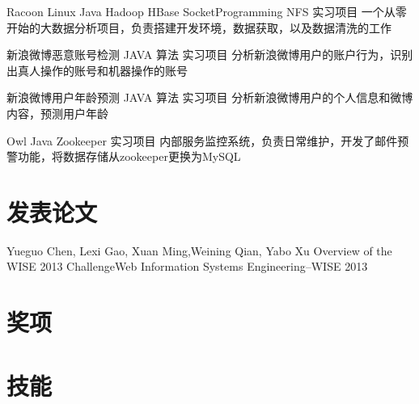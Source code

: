 \documentclass[11pt,a4paper]{moderncv}
\begin{document}
\vspace*{0.2\baselineskip}
{Racoon}
{Linux Java Hadoop HBase SocketProgramming NFS}
{实习项目}{}
{一个从零开始的大数据分析项目，负责搭建开发环境，数据获取，以及数据清洗的工作}

\vspace*{0.2\baselineskip}
{新浪微博恶意账号检测}
{JAVA 算法}
{实习项目}{}
{分析新浪微博用户的账户行为，识别出真人操作的账号和机器操作的账号}

\vspace*{0.2\baselineskip}
{新浪微博用户年龄预测}
{JAVA 算法}
{实习项目}{}
{分析新浪微博用户的个人信息和微博内容，预测用户年龄}

\vspace*{0.2\baselineskip}
{Owl}
{Java Zookeeper}
{实习项目}{}
{内部服务监控系统，负责日常维护，开发了邮件预警功能，将数据存储从zookeeper更换为MySQL}


\renewcommand{\baselinestretch}{1.0}

\section{发表论文}
{\textnormal{Yueguo Chen, Lexi Gao, } Xuan Ming\textnormal{,Weining Qian, Yabo Xu}}
{Overview of the WISE 2013 Challenge}{Web Information Systems Engineering–WISE 2013 }
{}{}{}

\section{奖项}

\section{技能}

\closesection{}                   %
\end{document}
